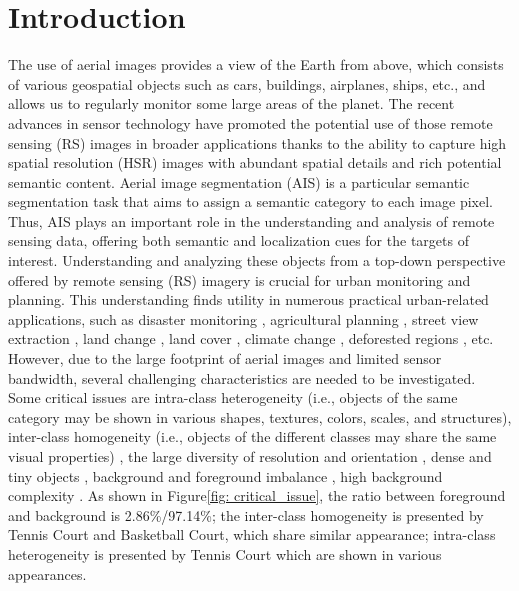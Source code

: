 \documentclass[journal]{IEEEtran}
\begin{document}
\section{Introduction}
\label{sec:intro}
The use of aerial images provides a view of the Earth from above, which consists of various geospatial objects such as cars, buildings, airplanes, ships, etc., and allows us to regularly monitor some large areas of the planet. The recent advances in sensor technology have promoted the potential use of those remote sensing (RS) images in broader applications thanks to the ability to capture high spatial resolution (HSR) images with abundant spatial details and rich potential semantic content. Aerial image segmentation (AIS) is a particular semantic segmentation task that aims to assign a semantic category to each image pixel. Thus, AIS plays an important role in the understanding and analysis of remote sensing data, offering both semantic and localization cues for the targets of interest.
Understanding and analyzing these objects from 
a top-down perspective offered by remote sensing (RS) imagery is crucial for urban monitoring and planning. 
This understanding finds utility in numerous practical urban-related applications,
such  as disaster monitoring \cite{schumann2018assisting}, agricultural planning \cite{weiss2020remote}, street view extraction \cite{griffiths2019improving, shamsolmoali2020road}, land change \cite{samie2020examining, marcos2018land, xia2023openearthmap}, land cover \cite{wang2021loveda}, climate change \cite{o2013use}, deforested regions \cite{andrade2020evaluation}, etc. However, due to the large footprint of aerial images and limited sensor bandwidth, several challenging characteristics are needed to be investigated. Some critical issues are intra-class heterogeneity (i.e., objects of the same category may be shown in various shapes, textures, colors, scales, and structures), inter-class homogeneity (i.e., objects of the different classes may share the same visual properties) \cite{wang2020cse}, the large diversity of resolution and orientation \cite{Waqas2019}, dense and tiny objects \cite{shafique2022deep}, background and foreground imbalance \cite{zheng2020foreground}, high background complexity \cite{zheng2020foreground}. As shown in Figure\ref{fig: critical_issue}, the ratio between foreground and background is 2.86\%/97.14\%; the inter-class homogeneity is presented by Tennis Court and Basketball Court, which share similar appearance; intra-class heterogeneity is presented by Tennis Court which are shown in various appearances.
\end{document}
